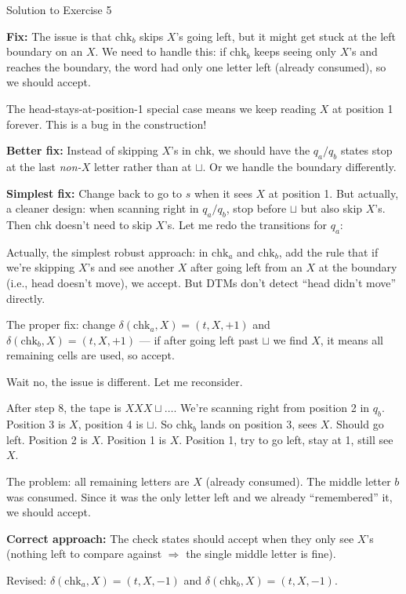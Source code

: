 \documentclass[11pt,a4paper]{article}
\newcommand{\blank}{\sqcup}
\begin{document}
\begin{solutionbox}{Solution to Exercise 5}
\begin{enumerate}[label=\arabic*.]
    \textbf{Fix:} The issue is that $\text{chk}_b$ skips $X$'s going left, but it might get stuck at the left boundary on an $X$. We need to handle this: if $\text{chk}_b$ keeps seeing only $X$'s and reaches the boundary, the word had only one letter left (already consumed), so we should accept.

    The head-stays-at-position-1 special case means we keep reading $X$ at position 1 forever. This is a bug in the construction!

    \textbf{Better fix:} Instead of skipping $X$'s in $\text{chk}$, we should have the $q_a/q_b$ states stop at the last \emph{non-$X$} letter rather than at $\blank$. Or we handle the boundary differently.

    \textbf{Simplest fix:} Change $\text{back}$ to go to $s$ when it sees $X$ at position 1. But actually, a cleaner design: when scanning right in $q_a/q_b$, stop before $\blank$ but also skip $X$'s. Then $\text{chk}$ doesn't need to skip $X$'s. Let me redo the transitions for $q_a$:

    Actually, the simplest robust approach: in $\text{chk}_a$ and $\text{chk}_b$, add the rule that if we're skipping $X$'s and see another $X$ after going left from an $X$ at the boundary (i.e., head doesn't move), we accept. But DTMs don't detect ``head didn't move'' directly.

    The proper fix: change $\delta(\text{chk}_a, X) = (t, X, +1)$ and $\delta(\text{chk}_b, X) = (t, X, +1)$ --- if after going left past $\blank$ we find $X$, it means all remaining cells are used, so accept.

    Wait no, the issue is different. Let me reconsider.

    After step 8, the tape is $XXX\blank\ldots$. We're scanning right from position 2 in $q_b$. Position 3 is $X$, position 4 is $\blank$. So $\text{chk}_b$ lands on position 3, sees $X$. Should go left. Position 2 is $X$. Position 1 is $X$. Position 1, try to go left, stay at 1, still see $X$.

    The problem: all remaining letters are $X$ (already consumed). The middle letter $b$ was consumed. Since it was the only letter left and we already ``remembered'' it, we should accept.

    \textbf{Correct approach:} The check states should accept when they only see $X$'s (nothing left to compare against $\Rightarrow$ the single middle letter is fine).

    Revised: $\delta(\text{chk}_a, X) = (t, X, -1)$ and $\delta(\text{chk}_b, X) = (t, X, -1)$.


\end{enumerate}
\end{solutionbox}
\end{document}
